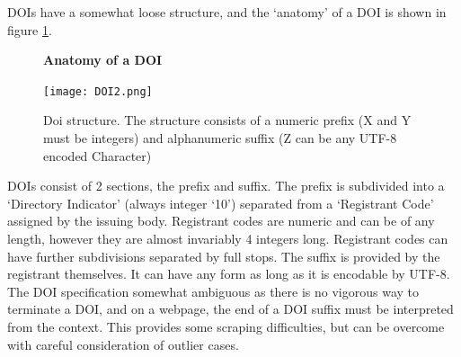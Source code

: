 \documentclass[11pt, oneside]{article}   	%
\begin{document}
DOIs have a somewhat loose structure, and the `anatomy' of a DOI is shown in figure \ref{fig:DOI}.

\begin{figure}[H]
    \centering
    \textbf{Anatomy of a DOI}\par\medskip
    \texttt{[image: DOI2.png]}
    \caption{Doi structure. The structure consists of a numeric prefix (X and Y must be integers) and alphanumeric suffix (Z can be any UTF-8 encoded Character) \label{fig:DOI}}
\end{figure}
DOIs consist of 2 sections, the prefix and suffix. The prefix is subdivided into a `Directory Indicator' (always integer `10') separated from a `Registrant Code' assigned by the issuing body. Registrant codes are numeric and can be of any length, however they are almost invariably 4 integers long. Registrant codes can have further subdivisions separated by full stops. The suffix is provided by the registrant themselves. It can have any form as long as it is encodable by UTF-8. The DOI specification somewhat ambiguous as there is no vigorous way to terminate a DOI, and on a webpage, the end of a DOI suffix must be interpreted from the context. This provides some scraping difficulties, but can be overcome with careful consideration of outlier cases.
\end{document}
